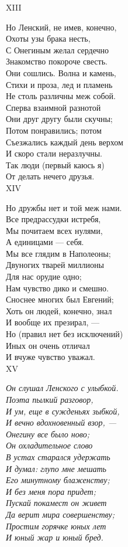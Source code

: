 XIII

Но Ленский, не имев, конечно,\\
Охоты узы брака несть,\\
С Онегиным желал сердечно\\
Знакомство покороче свесть.\\
Они сошлись. Волна и камень,\\
Стихи и проза, лед и пламень\\
Не столь различны меж собой.\\
Сперва взаимной разнотой\\
Они друг другу были скучны;\\
Потом понравились; потом\\
Съезжались каждый день верхом\\
И скоро стали неразлучны.\\
Так люди (первый каюсь я)\\
От делать нечего друзья.\\

XIV

Но дружбы нет и той меж нами.\\
Все предрассудки истребя,\\
Мы почитаем всех нулями,\\
А единицами — себя.\\
Мы все глядим в Наполеоны;\\
Двуногих тварей миллионы\\
Для нас орудие одно;\\
Нам чувство дико и смешно.\\
Сноснее многих был Евгений;\\
Хоть он людей, конечно, знал\\
И вообще их презирал, —\\
Но (правил нет без исключений)\\
Иных он очень отличал\\
И вчуже чувство уважал.\\

XV

\emph{Он слушал Ленского с улыбкой.\\
Поэта пылкий разговор,\\
И ум, еще в сужденьях зыбкой,\\
И вечно вдохновенный взор, —\\
Онегину все было ново;\\
Он охладительное слово\\
В устах старался удержать\\
И думал: глупо мне мешать\\
Его минутному блаженству;\\
И без меня пора придет;\\
Пускай покамест он живет\\
Да верит мира совершенству;\\
Простим горячке юных лет\\
И юный жар и юный бред.}\\

